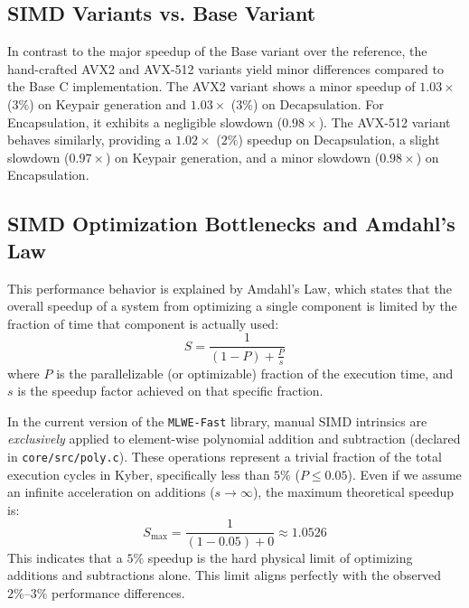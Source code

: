 \subsection{SIMD Variants vs. Base Variant}
\label{sub:simd_vs_base}

In contrast to the major speedup of the Base variant over the reference, the hand-crafted AVX2 and AVX-512 variants yield minor differences compared to the Base C implementation. The AVX2 variant shows a minor speedup of $1.03\times$ ($3\%$) on Keypair generation and $1.03\times$ ($3\%$) on Decapsulation. For Encapsulation, it exhibits a negligible slowdown ($0.98\times$). The AVX-512 variant behaves similarly, providing a $1.02\times$ ($2\%$) speedup on Decapsulation, a slight slowdown ($0.97\times$) on Keypair generation, and a minor slowdown ($0.98\times$) on Encapsulation.

\subsection{SIMD Optimization Bottlenecks and Amdahl's Law}
\label{sub:amdahls_law}

This performance behavior is explained by Amdahl's Law, which states that the overall speedup of a system from optimizing a single component is limited by the fraction of time that component is actually used:
\begin{equation}
    S = \frac{1}{(1-P) + \frac{P}{s}}
\end{equation}
where $P$ is the parallelizable (or optimizable) fraction of the execution time, and $s$ is the speedup factor achieved on that specific fraction.

In the current version of the \texttt{MLWE-Fast} library, manual SIMD intrinsics are \textit{exclusively} applied to element-wise polynomial addition and subtraction (declared in \texttt{core/}\allowbreak\texttt{src/}\allowbreak\texttt{poly.c}). These operations represent a trivial fraction of the total execution cycles in Kyber, specifically less than $5\%$ ($P \le 0.05$). Even if we assume an infinite acceleration on additions ($s \to \infty$), the maximum theoretical speedup is:
\begin{equation}
    S_{\text{max}} = \frac{1}{(1-0.05) + 0} \approx 1.0526
\end{equation}
This indicates that a $5\%$ speedup is the hard physical limit of optimizing additions and subtractions alone. This limit aligns perfectly with the observed $2\%\text{--}3\%$ performance differences.

